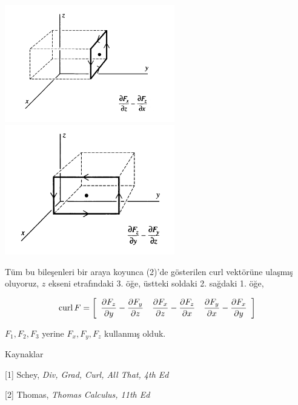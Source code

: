 \documentclass[12pt,fleqn]{article}\usepackage{../../common}
\begin{document}
\includegraphics[width=20em]{calc_multi_70_div_curl_lap_09.png}
\includegraphics[width=20em]{calc_multi_70_div_curl_lap_10.png}

Tüm bu bileşenleri bir araya koyunca (2)'de gösterilen curl vektörüne ulaşmış
oluyoruz, $z$ ekseni etrafındaki 3. öğe, üstteki soldaki 2. sağdaki 1. öğe,

$$
\operatorname{curl} F = \left[\begin{array}{ccc} 
\dfrac{\partial F_z}{\partial y} - \dfrac{\partial F_y}{\partial z} & 
\dfrac{\partial F_x}{\partial z} - \dfrac{\partial F_z}{\partial x} & 
\dfrac{\partial F_y}{\partial x} - \dfrac{\partial F_x}{\partial y} 
\end{array}\right]
$$

$F_1,F_2,F_3$ yerine $F_x,F_y,F_z$ kullanmış olduk.

Kaynaklar

[1] Schey, {\em Div, Grad, Curl, All That, 4th Ed}

[2] Thomas, {\em Thomas Calculus, 11th Ed}
\end{document}
